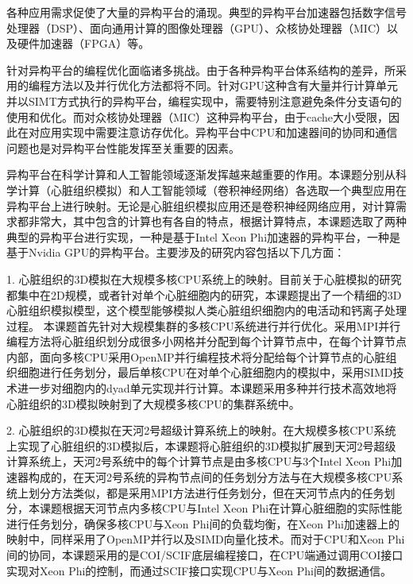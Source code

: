 \begin{cabstract}
各种应用需求促使了大量的异构平台的涌现。典型的异构平台加速器包括数字信号处理器（DSP）、面向通用计算的图像处理器（GPU）、众核协处理器（MIC）以及硬件加速器（FPGA）等。

针对异构平台的编程优化面临诸多挑战。由于各种异构平台体系结构的差异，所采用的编程方法以及并行优化方法都将不同。针对GPU这种含有大量并行计算单元并以SIMT方式执行的异构平台，编程实现中，需要特别注意避免条件分支语句的使用和优化。而对众核协处理器（MIC）这种异构平台，由于cache大小受限，因此在对应用实现中需要注意访存优化。异构平台中CPU和加速器间的协同和通信问题也是对异构平台性能发挥至关重要的因素。%

异构平台在科学计算和人工智能领域逐渐发挥越来越重要的作用。本课题分别从科学计算（心脏组织模拟）和人工智能领域（卷积神经网络）各选取一个典型应用在异构平台上进行映射。无论是心脏组织模拟应用还是卷积神经网络应用，对计算需求都非常大，其中包含的计算也有各自的特点，根据计算特点，本课题选取了两种典型的异构平台进行实现，一种是基于Intel Xeon Phi加速器的异构平台，一种是基于Nvidia GPU的异构平台。主要涉及的研究内容包括以下几方面：
\begin{compactitem}
\item[1.]心脏组织的3D模拟在大规模多核CPU系统上的映射。目前关于心脏模拟的研究都集中在2D规模，或者针对单个心脏细胞内的研究，本课题提出了一个精细的3D心脏组织模拟模型，这个模型能够模拟人类心脏组织细胞内的电活动和钙离子处理过程。%
本课题首先针对大规模集群的多核CPU系统进行并行优化。采用MPI并行编程方法将心脏组织划分成很多小网格并分配到每个计算节点中，在每个计算节点内部，面向多核CPU采用OpenMP并行编程技术将分配给每个计算节点的心脏组织细胞进行任务划分，最后单核CPU在对单个心脏细胞内的模拟中，采用SIMD技术进一步对细胞内的dyad单元实现并行计算。本课题采用多种并行技术高效地将心脏组织的3D模拟映射到了大规模多核CPU的集群系统中。

\item[2.]心脏组织的3D模拟在天河2号超级计算系统上的映射。在大规模多核CPU系统上实现了心脏组织的3D模拟后，本课题将心脏组织的3D模拟扩展到天河2号超级计算系统上，天河2号系统中的每个计算节点是由多核CPU与3个Intel Xeon Phi加速器构成的，在天河2号系统的异构节点间的任务划分方法与在大规模多核CPU系统上划分方法类似，都是采用MPI方法进行任务划分，但在天河节点内的任务划分，本课题根据天河节点内多核CPU与Intel Xeon Phi在计算心脏细胞的实际性能进行任务划分，确保多核CPU与Xeon Phi间的负载均衡，在Xeon Phi加速器上的映射中，同样采用了OpenMP并行以及SIMD向量化技术。而对于CPU和Xeon Phi间的协同，本课题采用的是COI/SCIF底层编程接口，在CPU端通过调用COI接口实现对Xeon Phi的控制，而通过SCIF接口实现CPU与Xeon Phi间的数据通信。


\end{compactitem}
\end{cabstract}
